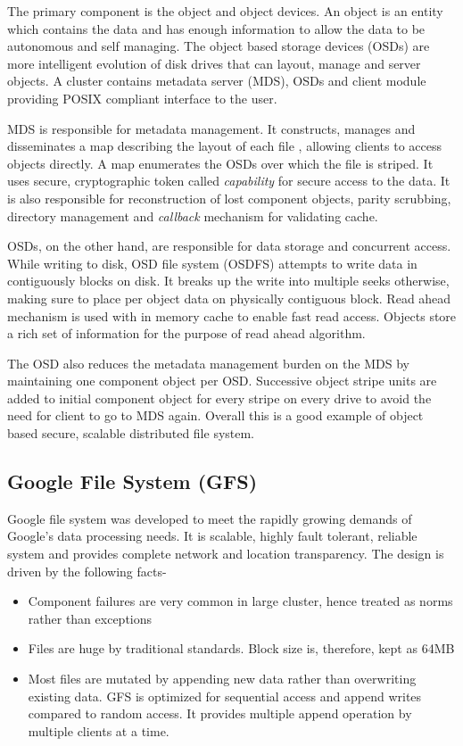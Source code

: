 \documentclass[a4paper,12pt]{article}
\begin{document}
The primary component is the object and object devices. An object is an entity which contains the data and has enough information to allow the data to be autonomous and self managing. The object based storage devices (OSDs) are more intelligent evolution of disk drives that can layout, manage and server objects. A cluster contains metadata server (MDS), OSDs and client module providing POSIX compliant interface to the user.

MDS is responsible for metadata management. It constructs, manages and disseminates a map describing the layout of each file , allowing clients to access objects directly. A map enumerates the OSDs over which the file is striped. It uses secure, cryptographic token called \textit{capability} for secure access to the data. It is also responsible for reconstruction of lost component objects, parity scrubbing, directory management and \textit{callback} mechanism for validating cache.

OSDs, on the other hand, are responsible for data storage and concurrent access. While writing to disk, OSD file system (OSDFS) attempts to write data in contiguously blocks on disk. It breaks up the write into multiple seeks otherwise, making sure to place per object data on physically contiguous block. Read ahead mechanism is used with in memory cache to enable fast read access. Objects store a rich set of information for the purpose of read ahead algorithm.

The OSD also reduces the metadata management burden on the MDS by maintaining one component object per OSD. Successive object stripe units are added to initial component object for every stripe on every drive to avoid the need for client to go to MDS again. Overall this is a good example of object based secure, scalable distributed file system.

\subsection{Google File System (GFS) \cite{ghemawat03}}
\label{sec:gfs}
Google file system was developed to meet the rapidly growing demands of Google's data processing needs. It is scalable, highly fault tolerant, reliable system and provides complete network and location transparency. The design is driven by the following facts-
\begin{itemize}
\item  Component failures are very common in large cluster, hence treated as norms rather than exceptions
\item Files are huge by traditional standards. Block size is, therefore, kept as 64MB
\item Most files are mutated by appending new data rather than overwriting existing data. GFS is optimized for sequential access and append writes compared to random access. It provides multiple append operation by multiple clients at a time.
\end{itemize}
\end{document}

